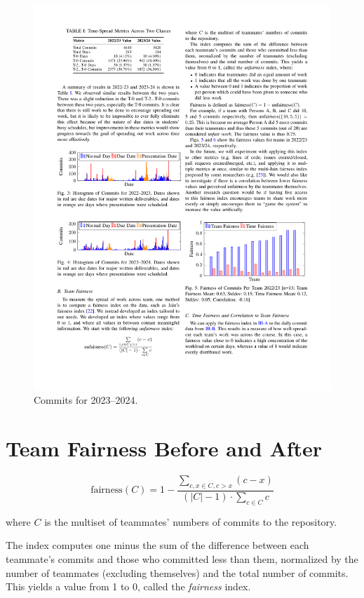 \documentclass[poster, a1, plainboxedsections]{sciposter}
\begin{document}
\begin{multicols}{2}
\begin{figure}[h!]
\centering
\includegraphics[width=1.0\linewidth]{../figures/HistCommits2023-24.pdf}
\caption{Commits for 2023--2024.}\label{Fig_23_24Timeline}
\end{figure}

\section*{Team Fairness Before and After}

$$
\text{fairness}(C) = 1 - \frac{ \sum\limits_{c, x \in C, c > x} (c-x)}{(\left|C\right| -
1) \cdot \sum\limits_{c \in C} c}
$$

\noindent where $C$ is the multiset of teammates' numbers of commits to the 
repository.

The index computes one minus the sum of the difference between each teammate's commits and
those who committed less than them, normalized by the number of teammates
(excluding themselves) and the total number of commits. This yields a value from
1 to 0, called the \textit{fairness} index.


\end{multicols}
\end{document}
